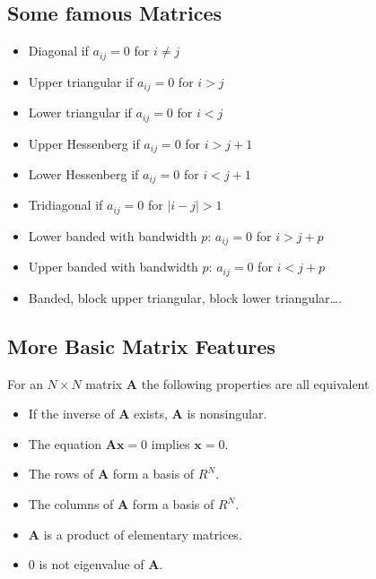 \documentclass[letterpaper,10pt,english]{sphinxmanual}
\begin{document}
\subsection{Some famous Matrices}
\label{\detokenize{chapter1:some-famous-matrices}}\begin{itemize}
\item {} 
Diagonal if \(a_{ij}=0\) for \(i\ne j\)

\item {} 
Upper triangular if \(a_{ij}=0\) for \(i > j\)

\item {} 
Lower triangular if \(a_{ij}=0\) for \(i < j\)

\item {} 
Upper Hessenberg if \(a_{ij}=0\) for \(i > j+1\)

\item {} 
Lower Hessenberg if \(a_{ij}=0\) for \(i < j+1\)

\item {} 
Tridiagonal if \(a_{ij}=0\) for \(|i -j| > 1\)

\item {} 
Lower banded with bandwidth \(p\): \(a_{ij}=0\) for \(i > j+p\)

\item {} 
Upper banded with bandwidth \(p\): \(a_{ij}=0\) for \(i < j+p\)

\item {} 
Banded, block upper triangular, block lower triangular….

\end{itemize}


\subsection{More Basic Matrix Features}
\label{\detokenize{chapter1:more-basic-matrix-features}}

For an \(N\times N\) matrix  \(\mathbf{A}\) the following properties are all equivalent
\begin{itemize}
\item {} 
If the inverse of \(\mathbf{A}\) exists, \(\mathbf{A}\) is nonsingular.

\item {} 
The equation \(\mathbf{Ax}=0\) implies \(\mathbf{x}=0\).

\item {} 
The rows of \(\mathbf{A}\) form a basis of \(R^N\).

\item {} 
The columns of \(\mathbf{A}\) form a basis of \(R^N\).

\item {} 
\(\mathbf{A}\) is a product of elementary matrices.

\item {} 
\(0\) is not eigenvalue of \(\mathbf{A}\).

\end{itemize}
\end{document}
